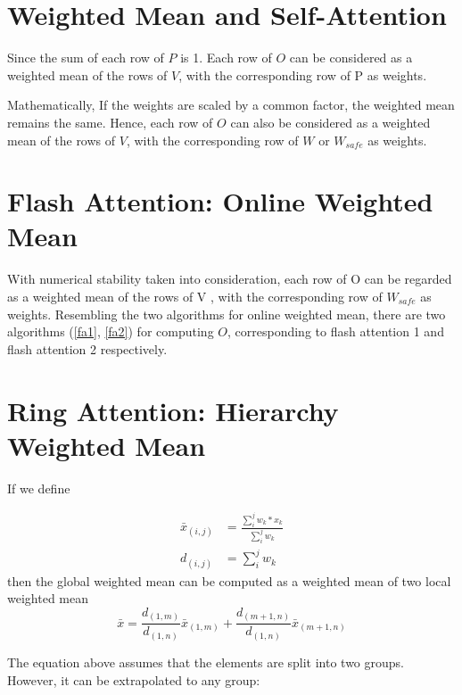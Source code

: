 \documentclass[a4paper]{article}
\begin{document}
    \section{Weighted Mean and Self-Attention}

    \par
    Since the sum of each row of $P$ is 1. Each row of $O$ can be considered as a weighted mean of the rows of $V$, with the corresponding row of P as weights.
    \newline
    \par
    Mathematically,  If the weights are scaled by a common factor, the weighted mean remains the same. Hence,
    each row of $O$ can also be considered as a weighted mean of the rows of $V$, with the corresponding row of $W$ or $W_{safe}$ as weights.

    \section{Flash Attention: Online Weighted Mean}

    With numerical stability taken into consideration, each row of O can be regarded as a weighted mean of the rows of V , with the corresponding row of $W_{safe}$ as weights. Resembling the two algorithms for online weighted mean, there are two algorithms  (\ref{fa1}, \ref{fa2}) for computing $O$, corresponding to flash attention 1 and flash attention 2 respectively.


    \section{Ring Attention: Hierarchy Weighted Mean}

    If we define

    \begin{align}
        \bar{x}_{(i,j)} &= \frac{\sum_{i}^{j} w_k*x_k}{\sum_{i}^{j}w_{k}} \\
        d_{(i,j)} &= \sum_{i}^{j}w_{k}
    \end{align}
    then the global weighted mean can be computed as a weighted mean of two local weighted mean
    \begin{equation}
        \bar{x} = \frac{d_{(1,m)}}{d_{(1,n)}} \bar{x}_{(1,m)} + \frac{d_{(m+1,n)}}{d_{(1,n)}}\bar{x}_{(m+1,n)}
    \end{equation}

    The equation above assumes that the elements are split into two groups. However, it can be extrapolated to any group:
\end{document}
